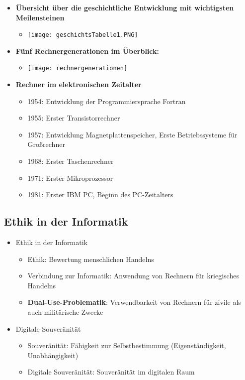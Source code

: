     \begin{itemize}
        \item \textbf{Übersicht über die geschichtliche Entwicklung mit wichtigsten Meilensteinen}
        \begin{itemize}
            \item[] \texttt{[image: geschichtsTabelle1.PNG]}
        \end{itemize}
        
        \item \textbf{Fünf Rechnergenerationen im Überblick:}
            \begin{itemize}
                \item[] \texttt{[image: rechnergenerationen]} 
            \end{itemize}
        
        \item \textbf{Rechner im elektronischen Zeitalter}
            \begin{itemize}
                \item 1954: Entwicklung der Programmiersprache Fortran
                \item 1955: Erster Transistorrechner
                \item 1957: Entwicklung Magnetplattenspeicher, Erste Betriebssysteme für Großrechner
                \item 1968: Erster Taschenrechner
                \item 1971: Erster Mikroprozessor
                \item 1981: Erster IBM PC, Beginn des PC-Zeitalters
            \end{itemize}
    \end{itemize}

\subsection{Ethik in der Informatik}

    \begin{itemize}
        \item Ethik in der Informatik
            \begin{itemize}
                \item Ethik: Bewertung menschlichen Handelns
                \item Verbindung zur Informatik: Anwendung von Rechnern für kriegisches Handelns
                \item \textbf{Dual-Use-Problematik}: Verwendbarkeit von Rechnern für zivile als auch militärische Zwecke
            \end{itemize}
        
        \item Digitale Souveränität
            \begin{itemize}
                \item Souveränität: Fähigkeit zur Selbstbestimmung (Eigenständigkeit, Unabhängigkeit)
                \item Digitale Souveränität: Souveränität im digitalen Raum
            \end{itemize}
    \end{itemize}

